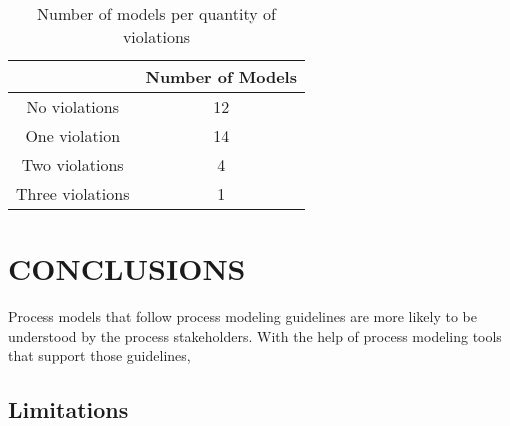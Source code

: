 \documentclass[a4paper,twoside]{article}
\begin{document}
\begin{table}[h]
	\centering
	\caption{Number of models per quantity of violations}
	\label{ModelsPerQuantityOfViolation}
	\begin{tabular}{|c|c|}
		\hline
		& Number of Models \\ \hline
		No violations & 12 \\ \hline
		One violation & 14 \\ \hline
		Two violations & 4 \\ \hline
		Three violations & 1 \\ \hline
	\end{tabular}
\end{table}

\section{CONCLUSIONS}\label{Conclusion}

\noindent Process models that follow process modeling guidelines are more likely to be understood by the process stakeholders. With the help of process modeling tools that support those guidelines, 

\subsection{Limitations}

\noindent 

%


\end{document}
